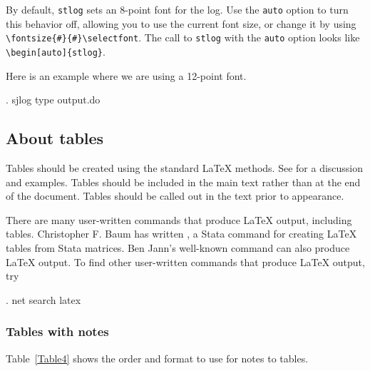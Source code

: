 By default, \texttt{stlog} sets an 8-point font for the log.  Use the
\texttt{auto} option to turn this behavior off, allowing you to use the
current font size, or change it by using\\ \verb+\fontsize{#}{#}\selectfont+.
The call to \texttt{stlog} with the \texttt{auto} option looks like
\verb+\begin[auto]{stlog}+.

Here is an example where we are using a 12-point font.

\vspace{-.2in}
{\fontsize{12}{13}\selectfont
\begin{stlog}[auto]
. sjlog type output.do
\end{stlog}
}

\subsection{About tables}

Tables should be created using the standard \LaTeX{} methods.  See
\citet{latexbook} for a discussion and examples. Tables should be included in
the main text rather than at the end of the document. Tables should be called
out in the text prior to appearance.

\clearpage
There are many user-written commands that produce \LaTeX{} output, including
tables.  Christopher F. Baum has written , a Stata command for
creating \LaTeX{} tables from Stata matrices.  Ben Jann's well-known
 command can also produce \LaTeX{} output.  To find other
user-written commands that produce \LaTeX{} output, try

\begin{stlog}
. net search latex
\end{stlog}

\subsubsection{Tables with notes}

Table~\ref{Table4} shows the order and format to use for notes to tables.

